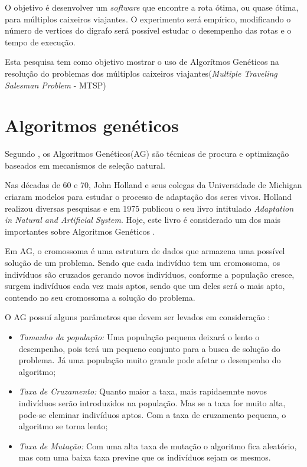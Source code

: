 \documentclass{abnt}
\begin{document}
		O objetivo é desenvolver um \textit{software} que encontre a rota ótima, ou quase ótima, para múltiplos caixeiros viajantes. O experimento será empírico, modificando o número de vertices do digrafo será possível estudar o desempenho das rotas e o tempo de execução.

		Esta pesquisa tem como objetivo mostrar o uso de Algorítmos Genéticos na resolução do problemas dos múltiplos caixeiros viajantes(\textit{Multiple Traveling Salesman Problem} - MTSP)
	
	\section{Algoritmos genéticos}

		Segundo \cite{0008-pdf}, os Algoritmos Genéticos(AG) são técnicas de procura e optimização baseados em mecanismos de seleção natural. 

		Nas décadas de 60 e 70, John Holland e seus colegas da Universidade de Michigan criaram modelos para estudar o processo de adaptação dos seres vivos. Holland realizou diversas pesquisas e em 1975 publicou o seu livro intitulado \textit{Adaptation in Natural and Artificial System}. Hoje, este livro é considerado um dos mais importantes sobre Algoritmos Genéticos \cite{0001-pdf}.

		Em AG, o cromossoma é uma estrutura de dados que armazena uma possível solução de um problema. Sendo que cada indivíduo tem um cromossoma, os indivíduos são cruzados gerando novos indivíduos, conforme a população cresce, surgem indivíduos cada vez mais aptos, sendo que um deles será o mais apto, contendo no seu cromossoma a solução do problema.

		O AG possuí alguns parâmetros que devem ser levados em consideração \cite{0001-pdf}:

		\begin{itemize}
			\item \textit{Tamanho da população: } Uma população pequena deixará o lento o desempenho, pois terá um pequeno conjunto para a busca de solução do problema. Já uma população muito grande pode afetar o desenpenho do algoritmo;
			\item \textit{Taxa de Cruzamento: } Quanto maior a taxa, mais rapidaemnte novos indivíduos serão introduzidos na população. Mas se a taxa for muito alta, pode-se eleminar indivíduos aptos. Com a taxa de cruzamento pequena, o algoritmo se torna lento;
			\item \textit{Taxa de Mutação: } Com uma alta taxa de mutação o algoritmo fica aleatório, mas com uma baixa taxa previne que os indivíduos sejam os mesmos.
		\end{itemize}
\end{document}
